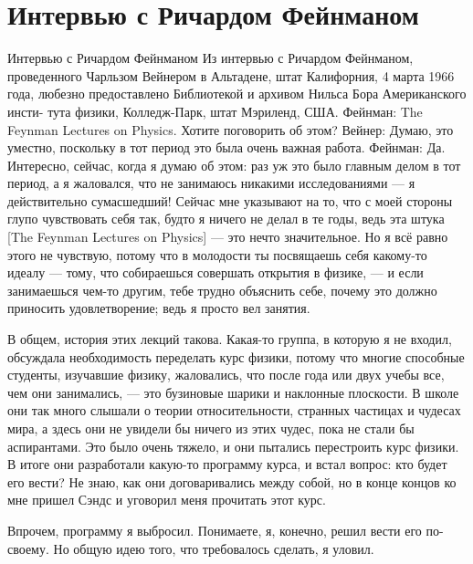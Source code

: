 \documentclass[10pt,oneside]{article}
\begin{document}
\section*{Интервью с Ричардом Фейнманом}
\label{tips-sec-6-интервью-с-ричардом-фейнманом}
Интервью с Ричардом Фейнманом Из интервью с Ричардом Фейнманом, проведенного Чарльзом Вейнером в Альтадене, штат Калифорния, 4 марта 1966 года, любезно предоставлено Библиотекой и архивом Нильса Бора Американского инсти- тута физики, Колледж-Парк, штат Мэриленд, США. Фейнман: The Feynman Lectures on Physics. Хотите поговорить об этом? Вейнер: Думаю, это уместно, поскольку в тот период это была очень важная работа. Фейнман: Да. Интересно, сейчас, когда я думаю об этом: раз уж это было главным делом в тот период, а я жаловался, что не занимаюсь никакими исследованиями --- я действительно сумасшедший! Сейчас мне указывают на то, что с моей стороны глупо чувствовать себя так, будто я ничего не делал в те годы, ведь эта штука [The Feynman Lectures on Physics] --- это нечто значительное. Но я всё равно этого не чувствую, потому что в молодости ты посвящаешь себя какому-то идеалу --- тому, что собираешься совершать открытия в физике, --- и если занимаешься чем-то другим, тебе трудно объяснить себе, почему это должно приносить удовлетворение; ведь я просто вел занятия.\par

В общем, история этих лекций такова. Какая-то группа, в которую я не входил, обсуждала необходимость переделать курс физики, потому что многие способные студенты, изучавшие физику, жаловались, что после года или двух учебы все, чем они занимались, --- это бузиновые шарики и наклонные плоскости. В школе они так много слышали о теории относительности, странных частицах и чудесах мира, а здесь они не увидели бы ничего из этих чудес, пока не стали бы аспирантами. Это было очень тяжело, и они пытались перестроить курс физики. В итоге они разработали какую-то программу курса, и встал вопрос: кто будет его вести? Не знаю, как они договаривались между собой, но в конце концов ко мне пришел Сэндс и уговорил меня прочитать этот курс.\par

Впрочем, программу я выбросил. Понимаете, я, конечно, решил вести его по-своему. Но общую идею того, что требовалось сделать, я уловил.\par
\end{document}
